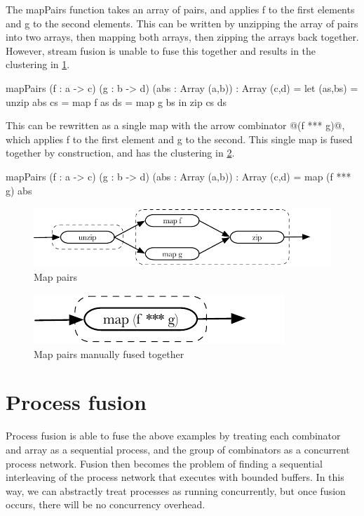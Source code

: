 The mapPairs function takes an array of pairs, and applies f to the first elements and g to the second elements.
This can be written by unzipping the array of pairs into two arrays, then mapping both arrays, then zipping the arrays back together.
However, stream fusion is unable to fuse this together and results in the clustering in \cref{fig:combinators:mappairs-zip}.

\begin{code}
mapPairs (f : a -> c) (g : b -> d) (abs : Array (a,b)) : Array (c,d)
 = let (as,bs) = unzip abs
        cs     = map f as
        ds     = map g bs
   in  zip cs ds
\end{code}

This can be rewritten as a single map with the arrow combinator @(f *** g)@, which applies f to the first element and g to the second.
This single map is fused together by construction, and has the clustering in \cref{fig:combinators:mappairs-arrow}.

\begin{code}
mapPairs (f : a -> c) (g : b -> d) (abs : Array (a,b)) : Array (c,d)
 = map (f *** g) abs
\end{code}

\begin{figure}
\center
\includegraphics{figs/combinators/mappairs-zip.pdf}
\caption{Map pairs}
\label{fig:combinators:mappairs-zip}
\end{figure}

\begin{figure}
\center
\includegraphics{figs/combinators/mappairs-arrow.pdf}
\caption{Map pairs manually fused together}
\label{fig:combinators:mappairs-arrow}
\end{figure}

\section{Process fusion}

Process fusion is able to fuse the above examples by treating each combinator and array as a sequential process, and the group of combinators as a concurrent process network.
Fusion then becomes the problem of finding a sequential interleaving of the process network that executes with bounded buffers.
In this way, we can abstractly treat processes as running concurrently, but once fusion occurs, there will be no concurrency overhead.

